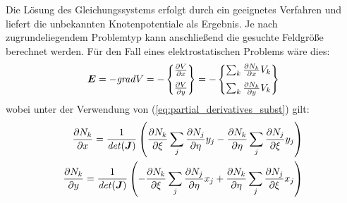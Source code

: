 Die Lösung des Gleichungssystems erfolgt durch ein geeignetes Verfahren und liefert die unbekannten Knotenpotentiale als Ergebnis. Je nach zugrundeliegendem Problemtyp kann anschließend die gesuchte Feldgröße berechnet werden. Für den Fall eines elektrostatischen Problems wäre dies: 
\begin{equation}
\vec{E} = -\mathit{grad}V = 
-\begin{Bmatrix}
\parDiff{V}{x} \\[2mm]
\parDiff{V}{y}
\end{Bmatrix} = 
%
-\begin{Bmatrix}
\sum_{k} \parDiff{N_k}{x} V_k\\[2mm]
\sum_{k} \parDiff{N_k}{y} V_k
\end{Bmatrix}
\end{equation}
wobei unter der Verwendung von (\ref{eq:partial_derivatives_subst}) gilt:
\begin{align*}
\frac{\partial N_k}{\partial x} = \frac{1}{\mathit{det}(\boldsymbol{J})} \left( \frac{\partial N_k}{\partial \xi} \sum_{j} \frac{\partial N_j}{\partial \eta} y_j - \frac{\partial N_k}{\partial \eta} \sum_{j} \frac{\partial N_j}{\partial \xi} y_j \right) \\
\frac{\partial N_k}{\partial y} = \frac{1}{\mathit{det}(\boldsymbol{J})} \left( -\frac{\partial N_k}{\partial \xi} \sum_{j} \frac{\partial N_j}{\partial \eta} x_j + \frac{\partial N_k}{\partial \eta} \sum_{j} \frac{\partial N_j}{\partial \xi} x_j \right) \\
\end{align*}

